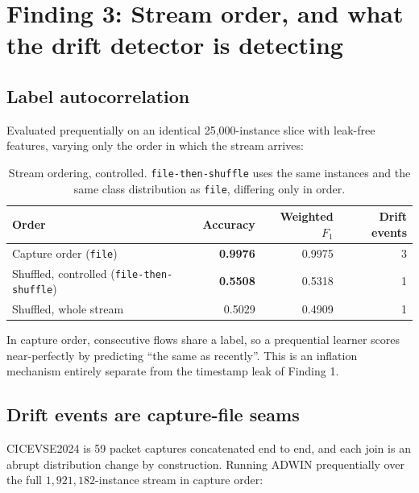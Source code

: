 \documentclass[11pt, a4paper]{article}
\begin{document}
\section{Finding 3: Stream order, and what the drift detector is detecting}

\subsection{Label autocorrelation}

Evaluated prequentially on an identical 25{,}000-instance slice with leak-free
features, varying only the order in which the stream arrives:

\begin{table}[h]
\centering
\caption{Stream ordering, controlled. \texttt{file-then-shuffle} uses the same
         instances and the same class distribution as \texttt{file}, differing
         only in order.}
\begin{tabular}{lrrr}
\toprule
\textbf{Order} & \textbf{Accuracy} & \textbf{Weighted $F_1$} & \textbf{Drift events} \\
\midrule
Capture order (\texttt{file})           & \textbf{0.9976} & 0.9975 & 3 \\
Shuffled, controlled (\texttt{file-then-shuffle}) & \textbf{0.5508} & 0.5318 & 1 \\
Shuffled, whole stream                  & 0.5029 & 0.4909 & 1 \\
\bottomrule
\end{tabular}
\end{table}

In capture order, consecutive flows share a label, so a prequential learner
scores near-perfectly by predicting ``the same as recently''. This is an
inflation mechanism entirely separate from the timestamp leak of Finding 1.

\subsection{Drift events are capture-file seams}

CICEVSE2024 is 59 packet captures concatenated end to end, and each join is an
abrupt distribution change by construction. Running ADWIN prequentially over the
full $1{,}921{,}182$-instance stream in capture order:
\end{document}

